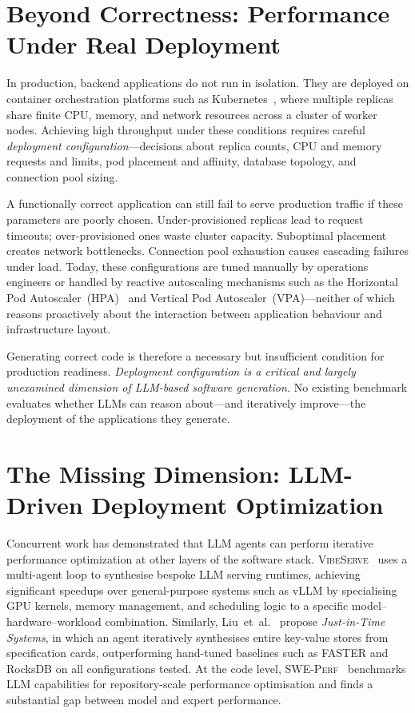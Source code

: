 \section{Beyond Correctness: Performance Under Real Deployment}
\label{sec:intro-gap}

In production, backend applications do not run in isolation.  They are deployed
on container orchestration platforms such as
Kubernetes~\cite{burns2016borg,kubernetes}, where multiple replicas share
finite CPU, memory, and network resources across a cluster of worker nodes.
Achieving high throughput under these conditions requires careful
\emph{deployment configuration}---decisions about replica counts, CPU and
memory requests and limits, pod placement and affinity, database topology, and
connection pool sizing.

A functionally correct application can still fail to serve production traffic
if these parameters are poorly chosen.  Under-provisioned replicas lead to
request timeouts; over-provisioned ones waste cluster capacity.  Suboptimal
placement creates network bottlenecks.  Connection pool exhaustion causes
cascading failures under load.  Today, these configurations are tuned manually
by operations engineers or handled by reactive autoscaling mechanisms such as
the Horizontal Pod Autoscaler~(HPA)~\cite{kubernetes-hpa} and Vertical Pod
Autoscaler~(VPA)---neither of which reasons proactively about the interaction
between application behaviour and infrastructure layout.

Generating correct code is therefore a necessary but insufficient condition for
production readiness.  \emph{Deployment configuration is a critical and largely
unexamined dimension of LLM-based software generation.}  No existing benchmark
evaluates whether LLMs can reason about---and iteratively improve---the
deployment of the applications they generate.


\section{The Missing Dimension: LLM-Driven Deployment Optimization}
\label{sec:intro-missing}

Concurrent work has demonstrated that LLM agents can perform iterative
performance optimization at other layers of the software stack.
\textsc{VibeServe}~\cite{kamahori2025vibeserve} uses a multi-agent loop to
synthesise bespoke LLM serving runtimes, achieving significant speedups over
general-purpose systems such as vLLM by specialising GPU kernels, memory
management, and scheduling logic to a specific model--hardware--workload
combination.  Similarly, Liu~et~al.~\cite{liu2025jitsystems} propose
\emph{Just-in-Time Systems}, in which an agent iteratively synthesises entire
key-value stores from specification cards, outperforming hand-tuned baselines
such as FASTER and RocksDB on all configurations tested.  At the code level,
\textsc{SWE-Perf}~\cite{he2025sweperf} benchmarks LLM capabilities for
repository-scale performance optimisation and finds a substantial gap between
model and expert performance.

